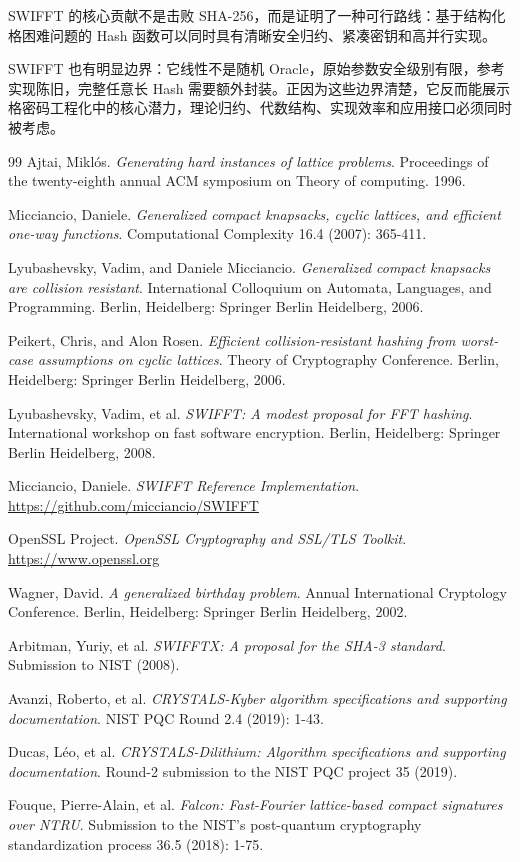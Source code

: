 \documentclass{article}
\begin{document}
SWIFFT 的核心贡献不是击败 SHA-256，而是证明了一种可行路线：基于结构化格困难问题的 Hash 函数可以同时具有清晰安全归约、紧凑密钥和高并行实现。

SWIFFT 也有明显边界：它线性不是随机 Oracle，原始参数安全级别有限，参考实现陈旧，完整任意长 Hash 需要额外封装。正因为这些边界清楚，它反而能展示格密码工程化中的核心潜力，理论归约、代数结构、实现效率和应用接口必须同时被考虑。



{}
\begin{thebibliography}{99}
     Ajtai, Mikl\'{o}s. \emph{Generating hard instances of lattice problems}. Proceedings of the twenty-eighth annual ACM symposium on Theory of computing. 1996.

     Micciancio, Daniele. \emph{Generalized compact knapsacks, cyclic lattices, and efficient one-way functions}. Computational Complexity 16.4 (2007): 365-411.

     Lyubashevsky, Vadim, and Daniele Micciancio. \emph{Generalized compact knapsacks are collision resistant}. International Colloquium on Automata, Languages, and Programming. Berlin, Heidelberg: Springer Berlin Heidelberg, 2006.

     Peikert, Chris, and Alon Rosen. \emph{Efficient collision-resistant hashing from worst-case assumptions on cyclic lattices}. Theory of Cryptography Conference. Berlin, Heidelberg: Springer Berlin Heidelberg, 2006.

     Lyubashevsky, Vadim, et al. \emph{SWIFFT: A modest proposal for FFT hashing}. International workshop on fast software encryption. Berlin, Heidelberg: Springer Berlin Heidelberg, 2008.

     Micciancio, Daniele. \emph{SWIFFT Reference Implementation}. \url{https://github.com/micciancio/SWIFFT}

     OpenSSL Project. \emph{OpenSSL Cryptography and SSL/TLS Toolkit}. \url{https://www.openssl.org}

     Wagner, David. \emph{A generalized birthday problem}. Annual International Cryptology Conference. Berlin, Heidelberg: Springer Berlin Heidelberg, 2002.

     Arbitman, Yuriy, et al. \emph{SWIFFTX: A proposal for the SHA-3 standard}. Submission to NIST (2008).

     Avanzi, Roberto, et al. \emph{CRYSTALS-Kyber algorithm specifications and supporting documentation}. NIST PQC Round 2.4 (2019): 1-43.

     Ducas, L\'{e}o, et al. \emph{CRYSTALS-Dilithium: Algorithm specifications and supporting documentation}. Round-2 submission to the NIST PQC project 35 (2019).

     Fouque, Pierre-Alain, et al. \emph{Falcon: Fast-Fourier lattice-based compact signatures over NTRU}. Submission to the NIST’s post-quantum cryptography standardization process 36.5 (2018): 1-75.
\end{thebibliography}
\end{document}

